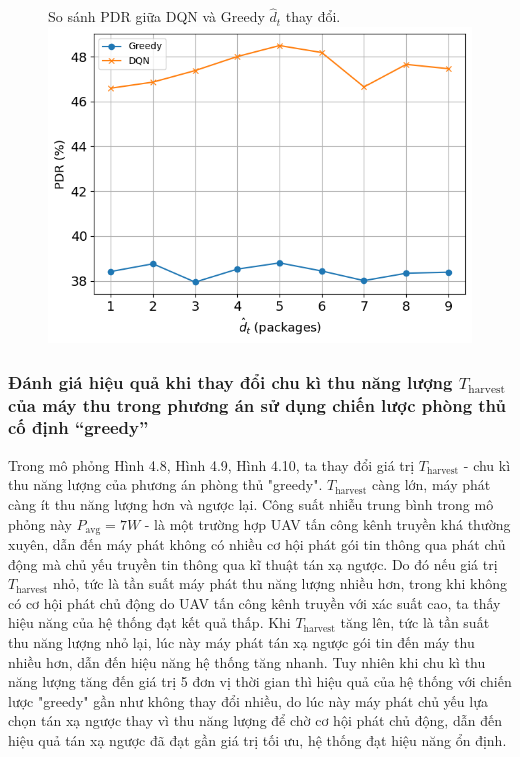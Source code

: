 \documentclass{uetgraduation}
\begin{document}
\begin{figure}{So sánh PDR giữa DQN và Greedy $\hat{d}_t$ thay đổi.}
    \centering
    \includegraphics[scale=0.8]{dt_pdr}
    \label{fig:dt_pdr}
\end{figure}

\subsubsection{Đánh giá hiệu quả khi thay đổi chu kì thu năng lượng $T_\text{harvest}$ của máy thu trong phương án sử dụng chiến lược phòng thủ cố định “greedy”}
Trong mô phỏng Hình 4.8, Hình 4.9, Hình 4.10, ta thay đổi giá trị $T_\text{harvest}$ - chu kì thu năng lượng của phương án phòng thủ "greedy". $T_\text{harvest}$ càng lớn, 
máy phát càng ít thu năng lượng hơn và ngược lại. Công suất nhiễu trung bình trong mô phỏng này $P_\text{avg} = 7W$ - là một trường hợp UAV tấn công kênh truyền khá thường xuyên,
dẫn đến máy phát không có nhiều cơ hội phát gói tin thông qua phát chủ động mà chủ yếu truyền tin thông qua kĩ thuật tán xạ ngược. Do đó nếu giá trị $T_\text{harvest}$
nhỏ, tức là tần suất máy phát thu năng lượng nhiều hơn, trong khi không có cơ hội phát chủ động do UAV tấn công kênh truyền với xác suất cao, ta thấy hiệu năng của hệ thống đạt
kết quả thấp. Khi $T_\text{harvest}$ tăng lên, tức là tần suất thu năng lượng nhỏ lại, lúc này máy phát tán xạ ngược gói tin đến máy thu nhiều hơn, dẫn đến hiệu năng hệ thống
tăng nhanh. Tuy nhiên khi chu kì thu năng lượng tăng đến giá trị 5 đơn vị thời gian thì hiệu quả của hệ thống với chiến lược "greedy" gần như không thay đổi nhiều, do lúc 
này máy phát chủ yếu lựa chọn tán xạ ngược thay vì thu năng lượng để chờ cơ hội phát chủ động, dẫn đến hiệu quả tán xạ ngược đã đạt gần giá trị tối ưu, hệ thống đạt hiệu năng
ổn định.
\end{document}
